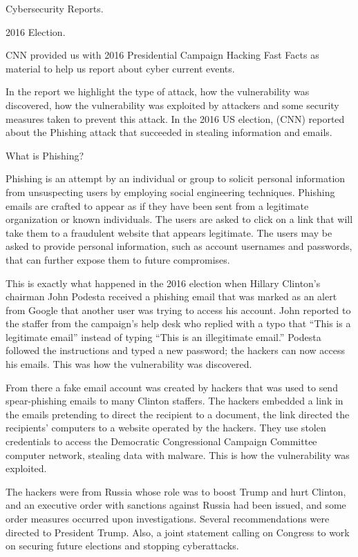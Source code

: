                         Cybersecurity Reports.

                            2016 Election.

CNN provided us with 2016 Presidential Campaign Hacking Fast Facts as material to help us report about cyber current events.

In the report we highlight the type of attack, how the vulnerability was discovered, how the vulnerability was exploited by attackers and some security measures taken to prevent this attack.
In the 2016 US election, (CNN) reported about the Phishing attack that succeeded in stealing information and emails.

What is Phishing?

Phishing is an attempt by an individual or group to solicit personal information from unsuspecting users by employing social engineering techniques. Phishing emails are crafted to appear as if they have been sent from a legitimate organization or known individuals. The users are asked to click on a link that will take them to a fraudulent website that appears legitimate. The users may be asked to provide personal information, such as account usernames and passwords, that can further expose them to future compromises.

This is exactly what happened in the 2016 election when Hillary Clinton’s chairman John Podesta received a phishing email that was marked as an alert from Google that another user was trying to access his account. John reported to the staffer from the campaign’s help desk who replied with a typo that “This is a legitimate email” instead of typing “This is an illegitimate email.” Podesta followed the instructions and typed a new password; the hackers can now access his emails. This was how the vulnerability was discovered.

From there a fake email account was created by hackers that was used to send spear-phishing emails to many Clinton staffers. The hackers embedded a link in the emails pretending to direct the recipient to a document, the link directed the recipients’ computers to a website operated by the hackers. They use stolen credentials to access the Democratic Congressional Campaign Committee computer network, stealing data with malware. This is how the vulnerability was exploited.

The hackers were from Russia whose role was to boost Trump and hurt Clinton, and an executive order with sanctions against Russia had been issued, and some order measures occurred upon investigations. Several recommendations were directed to President Trump. Also, a joint statement calling on Congress to work on securing future elections and stopping cyberattacks.

